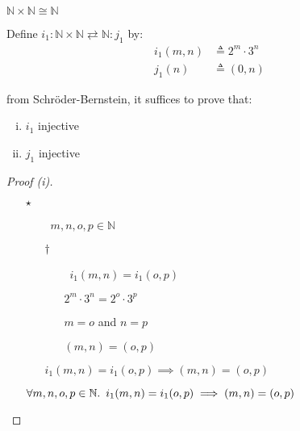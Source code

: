 \newcommand{\Nat}{\mathbb{N}}
\begin{prop}
  $\Nat\times\Nat\cong\Nat$

  Define $i_1 : \Nat\times\Nat\rightleftarrows\Nat : j_1$ by:
  \begin{align*}
    i_1(m, n) & \triangleq 2^m\cdot3^n\\
    j_1(n) & \triangleq (0, n)
  \end{align*}

  from Schr\"oder-Bernstein, it suffices to prove that:
  \begin{enumerate}[(i)]
    \item $i_1$ injective
    \item $j_1$ injective
  \end{enumerate}

  \begin{proof}[Proof (i)]~\\
    \begin{itemize}
      \item[$\star$]
        \begin{itemize}
          \item[\phs]\Let~$m,n,o,p\in\Nat$
            \marginnote{\Hyp}

          \item[$\dagger$]
            \begin{itemize}
              \item[\phantom{\imps}]\Ass~$i_1(m,n) = i_1(o,p)$
                \marginnote{\Hyp}

              \item[\iffs]
                $2^m\cdot3^n = 2^o\cdot3^p$

              \item[\iffs] $m = o$ and $n = p$

              \item[\iffs] $(m, n) = (o, p)$
            \end{itemize}
            \item[\imps]
              $i_1(m,n) = i_1(o,p) \implies (m,n) = (o,p)$
              \marginnote{\imps-\Intro-$\dagger$}
        \end{itemize}

        \item[\imps]
          $\forall m,n,o,p\in\Nat\ldotp~i_1(m,n) = i_1(o,p) \implies (m,n) = (o,p)$
          \marginnote{$\forall$-\Intro-$\star$}


\end{itemize}
\end{proof}
\end{prop}
